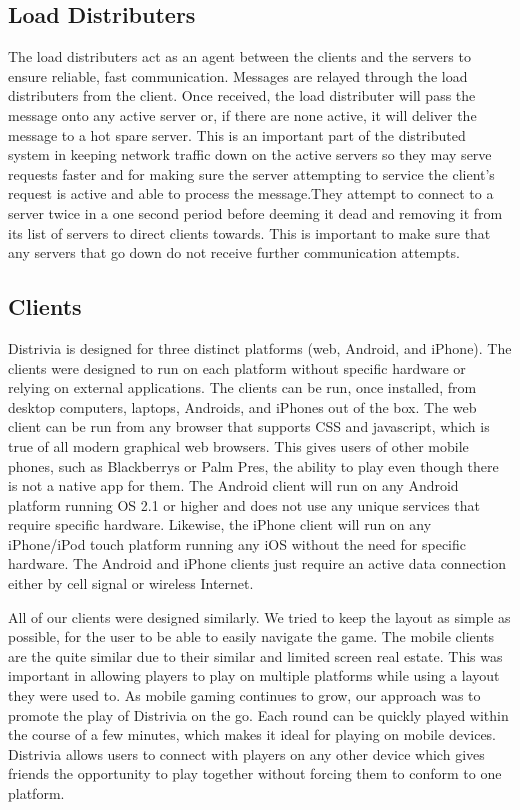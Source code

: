 \documentclass{dependencies/acm_proc_article-sp}
\begin{document}
\subsection{Load Distributers}
The load distributers act as an agent between the clients and the servers to
ensure reliable, fast communication. Messages are relayed through the load
distributers from the client. Once received, the load distributer will pass the message onto any active server or, if there are none active, it will deliver the message to a hot spare server. This is an important part of the distributed system in keeping network traffic down on the active servers so they may serve requests faster and for making sure the server attempting to service the client's request is active and able to process the message.They attempt to connect to a server twice in a one second period before deeming it dead and removing it from its list of servers to direct clients towards. This is important to make sure that any servers that go down do not receive further communication attempts.


\subsection{Clients}
Distrivia is designed for three distinct platforms (web, Android, and iPhone).
The clients were designed to run on each platform without specific hardware or relying on external applications.
The clients can be run, once installed, from desktop computers, laptops, Androids, and iPhones out of the box.
The web client can be run from any browser that supports CSS and javascript, which is true of all modern graphical web browsers. This gives users of other mobile phones, such as Blackberrys or Palm Pres, the ability to play even though there is not a native app for them. The Android client will run on any Android platform running OS 2.1 or higher and does not use any unique services that require specific hardware. Likewise, the iPhone client will run on any iPhone/iPod touch platform running any iOS without the need for specific hardware. The Android and iPhone clients just require an active data connection either by cell signal or wireless Internet.

All of our clients were designed similarly.
We tried to keep the layout as simple as possible, for the user to be able to easily navigate the game.
The mobile clients are the quite similar due to their similar and limited screen real estate.
This was important in allowing players to play on multiple platforms while using a layout they were used to.
As mobile gaming continues to grow, our approach was to promote the play of Distrivia on the go.
Each round can be quickly played within the course of a few minutes, which makes it ideal for playing on mobile devices.
Distrivia allows users to connect with players on any other device which gives friends the opportunity to play together without forcing them to conform to one platform.
\end{document}
